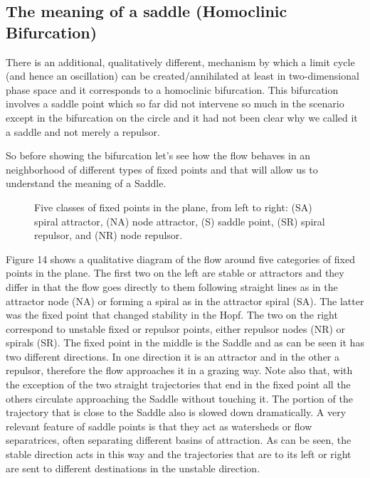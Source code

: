 \documentclass{article}
\begin{document}
\subsection{The meaning of a saddle (Homoclinic Bifurcation)}

There is an additional, qualitatively different, mechanism by which a limit cycle (and hence an oscillation) can be created/annihilated at least in two-dimensional phase space and it corresponds to a homoclinic bifurcation. 
This bifurcation involves a saddle point which so far did not intervene so much in the scenario except in the bifurcation on the circle and it had not been clear why we called it a saddle and not merely a repulsor. 

So before showing the bifurcation let's see how the flow behaves in an neighborhood of different types of fixed points and that will allow us to understand the meaning of a Saddle.

\begin{figure}[h]
    \centering
    \caption{Five classes of fixed points in the plane, from left to right: (SA) spiral attractor, (NA) node attractor, (S) saddle point, (SR) spiral repulsor, and (NR) node repulsor.} 
    \label{fig_homoclinic}
\end{figure}

Figure 14 shows a qualitative diagram of the flow around five categories of fixed points in the plane. 
The first two on the left are stable or attractors and they differ in that the flow goes directly to them following straight lines as in the attractor node (NA) or forming a spiral as in the attractor spiral (SA). 
The latter was the fixed point that changed stability in the Hopf. 
The two on the right correspond to unstable fixed or repulsor points, either repulsor nodes (NR) or spirals (SR). 
The fixed point in the middle is the Saddle and as can be seen it has two different directions. 
In one direction it is an attractor and in the other a repulsor, therefore the flow approaches it in a grazing way. 
Note also that, with the exception of the two straight trajectories that end in the fixed point all the others circulate approaching the Saddle without touching it. The portion of the trajectory that is close to the Saddle also is slowed down dramatically.
A very relevant feature of saddle points is that they act as watersheds or flow separatrices, often separating different basins of attraction. As can be seen, the stable direction acts in this way and the trajectories that are to its left or right are sent to different destinations in the unstable direction.
\end{document}
